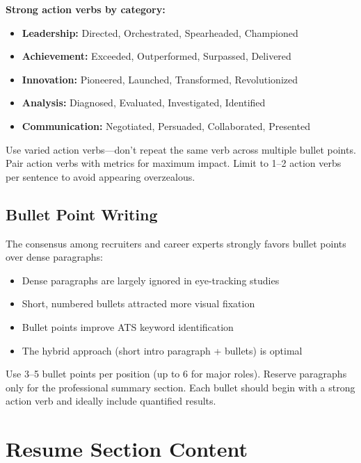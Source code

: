\documentclass[11pt,a4paper]{article}
\begin{document}
\textbf{Strong action verbs by category:}
\begin{itemize}
    \item \textbf{Leadership:} Directed, Orchestrated, Spearheaded, Championed
    \item \textbf{Achievement:} Exceeded, Outperformed, Surpassed, Delivered
    \item \textbf{Innovation:} Pioneered, Launched, Transformed, Revolutionized
    \item \textbf{Analysis:} Diagnosed, Evaluated, Investigated, Identified
    \item \textbf{Communication:} Negotiated, Persuaded, Collaborated, Presented
\end{itemize}

\begin{bestpractice}
Use varied action verbs---don't repeat the same verb across multiple bullet points. Pair action verbs with metrics for maximum impact. Limit to 1--2 action verbs per sentence to avoid appearing overzealous.
\end{bestpractice}

\subsection{Bullet Point Writing}

The consensus among recruiters and career experts strongly favors bullet points over dense paragraphs:

\begin{itemize}
    \item Dense paragraphs are largely ignored in eye-tracking studies
    \item Short, numbered bullets attracted more visual fixation
    \item Bullet points improve ATS keyword identification
    \item The hybrid approach (short intro paragraph + bullets) is optimal
\end{itemize}

\begin{bestpractice}
Use 3--5 bullet points per position (up to 6 for major roles). Reserve paragraphs only for the professional summary section. Each bullet should begin with a strong action verb and ideally include quantified results.
\end{bestpractice}

\section{Resume Section Content}
\end{document}
